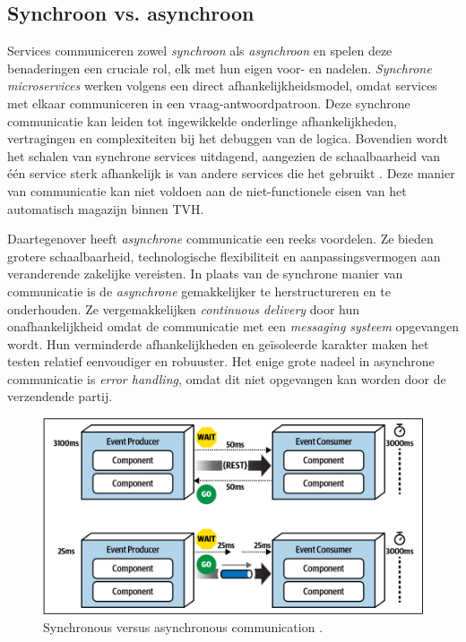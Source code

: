 \subsection{Synchroon vs. asynchroon}
Services communiceren zowel \emph{synchroon} als \emph{asynchroon} en spelen deze benaderingen een cruciale rol, 
elk met hun eigen voor- en nadelen. \emph{Synchrone microservices} werken volgens een direct 
afhankelijkheidsmodel, omdat services met elkaar communiceren in een vraag-antwoordpatroon. 
Deze synchrone communicatie kan leiden tot ingewikkelde onderlinge afhankelijkheden, vertragingen en complexiteiten bij het debuggen 
van de logica. Bovendien wordt het schalen van synchrone services uitdagend, 
aangezien de schaalbaarheid van één service sterk afhankelijk is van andere services die het gebruikt \autocite{Bellemare2020}. 
Deze manier van communicatie kan niet voldoen aan de niet-functionele eisen van het automatisch magazijn binnen TVH.
\newline

Daartegenover heeft \emph{asynchrone} communicatie een reeks voordelen. Ze bieden grotere schaalbaarheid, technologische 
flexibiliteit en aanpassingsvermogen aan veranderende zakelijke vereisten. 
In plaats van de synchrone manier van communicatie is de \emph{asynchrone} gemakkelijker te herstructureren en te onderhouden. 
Ze vergemakkelijken \emph{continuous delivery} door hun onafhankelijkheid omdat de communicatie 
met een \emph{messaging systeem} opgevangen wordt. 
Hun verminderde afhankelijkheden en geïsoleerde karakter maken het testen relatief eenvoudiger en robuuster.
Het enige grote nadeel in asynchrone communicatie is \emph{error handling}, 
omdat dit niet opgevangen kan worden door de verzendende partij.
\newline

\begin{figure}[h!]
  \centering
  \includegraphics[width=.5\textwidth]{../voorstel/img/synchronous_vs_async_calls.png}
  \caption{\label{fig:img}Synchronous versus asynchronous communication \autocite[figure 14 -- 13]{MarkRichards2021}.}
\end{figure}

